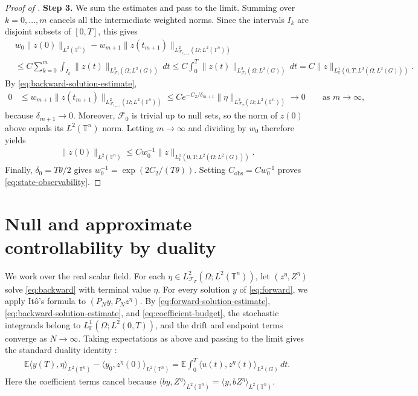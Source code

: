 \documentclass[print,wide]{draft}
\begin{document}
\begin{proof}[Proof of ]
\textbf{Step 3.} We sum the estimates and pass to the limit.
Summing over $k=0,\ldots,m$ cancels all the intermediate weighted norms.
Since the intervals $I_k$ are disjoint subsets of $[0,T]$, this gives
\begin{align*}
&w_0\lVert z(0)\rVert_{L^2(\mathbb T^n)}
-w_{m+1}\lVert z(t_{m+1})\rVert_{L^2_{\mathcal F_{t_{m+1}}}(\Omega;L^2(\mathbb T^n))}\\
&\leq C\sum_{k=0}^m\int_{I_k}
\lVert  z(t)\rVert_{L^2_{\mathcal F_t}(\Omega;L^2(G))}\,dt \leq C\int_0^T
\lVert  z(t)\rVert_{L^2_{\mathcal F_t}(\Omega;L^2(G))}\,dt 
=C\lVert  z\rVert_{L^1_{\mathbb F}(0,T;L^2(\Omega;L^2(G)))}.
\end{align*}
By \eqref{eq:backward-solution-estimate},
\begin{align*}
0&\leq w_{m+1}
\lVert z(t_{m+1})\rVert_{L^2_{\mathcal F_{t_{m+1}}}(\Omega;L^2(\mathbb T^n))}
\leq C e^{-C_2/\delta_{m+1}}
\lVert\eta\rVert_{L^2_{\mathcal F_T}(\Omega;L^2(\mathbb T^n))}
\longrightarrow0
\qquad\text{as }m\to\infty,
\end{align*}
because $\delta_{m+1}\to0$.
Moreover, $\mathcal F_0$ is trivial up to null sets, so the norm of $z(0)$
above equals its $L^2(\mathbb T^n)$ norm.
Letting $m\to\infty$ and dividing by $w_0$ therefore yields
\begin{align}\label{eq:L1-observability-unsquared}
\lVert z(0)\rVert_{L^2(\mathbb T^n)}
\leq Cw_0^{-1}
\lVert   z\rVert_{L^1_{\mathbb F}(0,T;L^2(\Omega;L^2(G)))}.
\end{align}
Finally, $\delta_0=T\theta/2$ gives
$w_0^{-1}=\exp(2C_2/(T\theta))$.
Setting $C_{\mathrm{obs}}=Cw_0^{-1}$ proves \eqref{eq:state-observability}.
\end{proof}

\section{Null and approximate controllability by duality}\label{sec:duality}

We work over the real scalar field.  For each
$\eta\in L^2_{\mathcal F_T}(\Omega;L^2(\mathbb T^n))$, let
$(z^\eta,Z^\eta)$ solve \eqref{eq:backward} with terminal value $\eta$.
For every solution $y$ of \eqref{eq:forward}, we apply It\^o's formula to $(P_Ny,P_Nz^\eta)$.
By \eqref{eq:forward-solution-estimate}, \eqref{eq:backward-solution-estimate}, and
\eqref{eq:coefficient-budget}, the stochastic integrands belong to
$L^1_{\mathbb F}(\Omega;L^2(0,T))$, and the drift and endpoint terms converge as $N\to\infty$.
Taking expectations as above and passing to the limit gives the standard duality identity
\cite[Section~4.4]{Lue2021a}:
\begin{align}\label{eq:duality-identity}
\mathbb E\langle y(T),\eta\rangle_{L^2(\mathbb T^n)}
-\langle y_0,z^\eta(0)\rangle_{L^2(\mathbb T^n)}
=\mathbb E\int_0^T\langle u(t),z^\eta(t)\rangle_{L^2(G)}\,dt.
\end{align}
Here the coefficient terms cancel because
$\langle by,Z^\eta\rangle_{L^2(\mathbb T^n)}=\langle y,bZ^\eta\rangle_{L^2(\mathbb T^n)}$.
\end{document}
